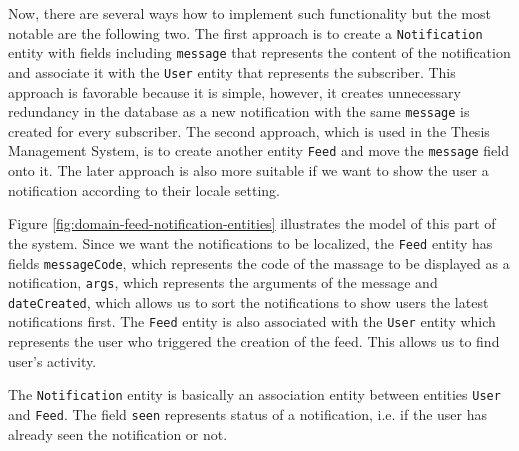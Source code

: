 Now, there are several ways how to implement such functionality but the most notable are the following two. The first approach is to create a \texttt{Notification} entity with fields including \texttt{message} that represents the content of the notification and associate it with the \texttt{User} entity that represents the subscriber. This approach is favorable because it is simple, however, it creates unnecessary redundancy in the database as a new notification with the same \texttt{message} is created for every subscriber. The second approach, which is used in the Thesis Management System, is to create another entity \texttt{Feed} and move the \texttt{message} field onto it. The later approach is also more suitable if we want to show the user a notification according to their locale setting. 

Figure \ref{fig:domain-feed-notification-entities} illustrates the model of this part of the system. Since we want the notifications to be localized, the \texttt{Feed} entity has fields \texttt{messageCode}, which represents the code of the massage to be displayed as a notification, \texttt{args}, which represents the arguments of the message and \texttt{dateCreated}, which allows us to sort the notifications to show users the latest notifications first. The \texttt{Feed} entity is also associated with the \texttt{User} entity which represents the user who triggered the creation of the feed. This allows us to find user's activity.

The \texttt{Notification} entity is basically an association entity between entities \texttt{User} and \texttt{Feed}. The field \texttt{seen} represents status of a notification, i.e. if the user has already seen the notification or not.


